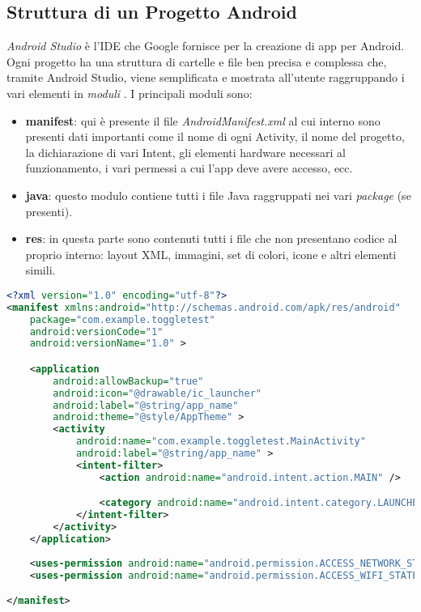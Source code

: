 \subsection{Struttura di un Progetto Android}
\textit{Android Studio} è l'IDE che Google fornisce per la creazione di app per Android. Ogni progetto ha una struttura di cartelle e file ben precisa e complessa che, tramite Android Studio, viene semplificata e mostrata all'utente raggruppando i vari elementi in \textit{moduli} \cite{androidstudio}. I principali moduli sono:

\begin{itemize}
    \item \textbf{manifest}: qui è presente il file \textit{AndroidManifest.xml} al cui interno sono presenti dati importanti come il nome di ogni Activity, il nome del progetto, la dichiarazione di vari Intent, gli elementi hardware necessari al funzionamento, i vari permessi a cui l'app deve avere accesso, ecc.
    \item \textbf{java}: questo modulo contiene tutti i file Java raggruppati nei vari \textit{package} (se presenti).
    \item \textbf{res}: in questa parte sono contenuti tutti i file che non presentano codice al proprio interno: layout XML, immagini, set di colori, icone e altri elementi simili.
\end{itemize}

\begin{lstlisting}[language=XML, caption=Esempio di AndroidManifest.xml]
<?xml version="1.0" encoding="utf-8"?>
<manifest xmlns:android="http://schemas.android.com/apk/res/android"
    package="com.example.toggletest"
    android:versionCode="1"
    android:versionName="1.0" >

    <application
        android:allowBackup="true"
        android:icon="@drawable/ic_launcher"
        android:label="@string/app_name"
        android:theme="@style/AppTheme" >
        <activity
            android:name="com.example.toggletest.MainActivity"
            android:label="@string/app_name" >
            <intent-filter>
                <action android:name="android.intent.action.MAIN" />

                <category android:name="android.intent.category.LAUNCHER" />
            </intent-filter>
        </activity>
    </application>
    
    <uses-permission android:name="android.permission.ACCESS_NETWORK_STATE" />
    <uses-permission android:name="android.permission.ACCESS_WIFI_STATE" />

</manifest>
\end{lstlisting}

